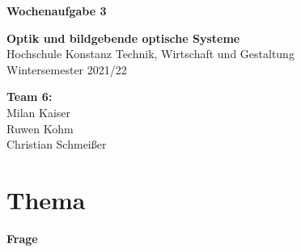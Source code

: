 \documentclass[a4paper]{article}
\begin{document}
	\thispagestyle{empty}
	
	\begin{center}\strut
		\bfseries\Huge
		Wochenaufgabe 3
	\end{center}
	\vfill
	
	\begin{center}\strut
		\textbf{Optik und bildgebende optische Systeme}\\
		Hochschule Konstanz Technik, Wirtschaft und Gestaltung\\
		Wintersemester 2021/22
	\end{center}
	
	\begin{center}\strut
		\textbf{Team 6:}\\
		Milan Kaiser\\
		Ruwen Kohm\\
		Christian Schmeißer\\
	\end{center}
	\vfill
	\vfill

	\clearpage
	
	\section{Thema}
	\textbf{Frage}
	
	
	
	
\end{document}
